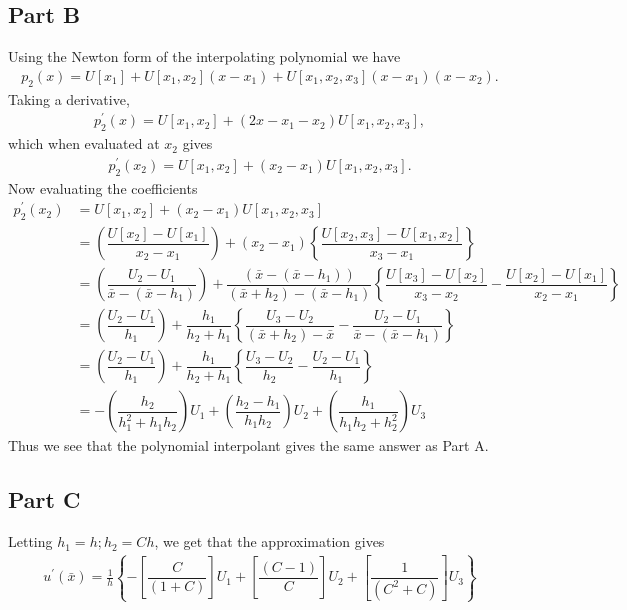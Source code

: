 \documentclass[12pt]{article}
\newcommand{\xbar}{\bar{x}}
\begin{document}
\subsection*{Part B}
Using the Newton form of the interpolating polynomial we have
\begin{align}
    p_{2}(x) = U[x_{1}] + U[x_{1}, x_{2}](x-x_{1}) + U[x_{1},x_{2},x_{3}](x-x_{1})(x-x_{2}).
\end{align}
Taking a derivative,
\begin{align}
    p_{2}^{\prime}(x) = U[x_{1}, x_{2}] + (2x-x_{1}-x_{2})U[x_{1}, x_{2}, x_{3}],
\end{align}
which when evaluated at $x_{2}$ gives
\begin{align}
    p_{2}^{\prime}(x_{2}) = U[x_{1}, x_{2}] + (x_{2}-x_{1})U[x_{1}, x_{2}, x_{3}].
\end{align}
Now evaluating the coefficients
\begin{subequations}
    \begin{align}
        p_{2}^{\prime}(x_{2}) &= U[x_{1}, x_{2}] + (x_{2}-x_{1})U[x_{1}, x_{2}, x_{3}]\\
        &= \left(\dfrac{U[x_{2}]-U[x_{1}]}{x_{2}-x_{1}}\right)
        + (x_{2}-x_{1})\left\{\dfrac{U[x_{2},x_{3}]-U[x_{1},x_{2}]}{x_{3}-x_{1}}\right\}\\
        &= \left(\dfrac{U_{2}-U_{1}}{\xbar-(\xbar-h_{1})}\right)
        + \dfrac{(\xbar-(\xbar-h_{1}))}{(\xbar+h_{2})-(\xbar-h_{1})}\left\{\dfrac{U[x_{3}]-U[x_{2}]}{x_{3}-x_{2}}
        -\dfrac{U[x_{2}]-U[x_{1}]}{x_{2}-x_{1}}\right\}\\
        &= \left(\dfrac{U_{2}-U_{1}}{h_{1}}\right)
        + \dfrac{h_{1}}{h_{2}+h_{1}}\left\{\dfrac{U_{3}-U_{2}}{(\xbar+h_{2})-\xbar}
        -\dfrac{U_{2}-U_{1}}{\xbar-(\xbar-h_{1})}\right\}\\
        &= \left(\dfrac{U_{2}-U_{1}}{h_{1}}\right)
        + \dfrac{h_{1}}{h_{2}+h_{1}}\left\{\dfrac{U_{3}-U_{2}}{h_{2}}
        - \dfrac{U_{2}-U_{1}}{h_{1}}\right\}\\
        &= -\left(\dfrac{h_{2}}{h_{1}^{2}+h_{1}h_{2}}\right)U_{1}
        + \left(\dfrac{h_{2}-h_{1}}{h_{1}h_{2}}\right)U_{2}
        + \left(\dfrac{h_{1}}{h_{1}h_{2}+h_{2}^{2}}\right)U_{3}
    \end{align}
\end{subequations}
Thus we see that the polynomial interpolant gives the same answer as Part A.

\subsection*{Part C}
Letting $h_{1} = h; h_{2} = Ch$, we get that the approximation gives
\begin{align}
    u^{\prime}(\xbar) = \frac{1}{h}\left\{-\left[\dfrac{C}{(1+C)}\right]U_{1}
    + \left[\dfrac{(C-1)}{C}\right]U_{2} + \left[\dfrac{1}{(C^{2}+C)}\right]U_{3}\right\}
\end{align}
\end{document}
